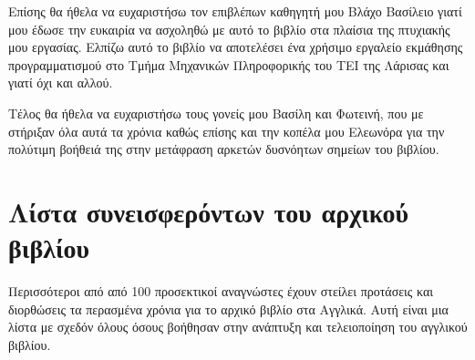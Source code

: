 \documentclass[10pt]{book}
\begin{document}
Επίσης θα ήθελα να ευχαριστήσω τον επιβλέπων καθηγητή μου Βλάχο Βασίλειο γιατί μου έδωσε την ευκαιρία να ασχοληθώ με αυτό το βιβλίο στα πλαίσια της πτυχιακής μου εργασίας. Ελπίζω αυτό το βιβλίο να αποτελέσει ένα χρήσιμο εργαλείο εκμάθησης προγραμματισμού στο Τμήμα Μηχανικών Πληροφορικής του ΤΕΙ της Λάρισας και γιατί όχι και αλλού.

Τέλος θα ήθελα να ευχαριστήσω τους γονείς μου Βασίλη και Φωτεινή, που με στήριξαν όλα αυτά τα χρόνια καθώς επίσης και την κοπέλα μου Ελεωνόρα για την πολύτιμη βοήθειά της στην μετάφραση αρκετών δυσνόητων σημείων του βιβλίου.


\section*{Λίστα συνεισφερόντων του αρχικού βιβλίου}


Περισσότεροι από από 100 προσεκτικοί αναγνώστες έχουν στείλει προτάσεις και διορθώσεις τα περασμένα χρόνια για το αρχικό βιβλίο στα Αγγλικά. Αυτή είναι μια λίστα με σχεδόν όλους όσους βοήθησαν στην ανάπτυξη και τελειοποίηση του αγγλικού βιβλίου. 
\end{document}
